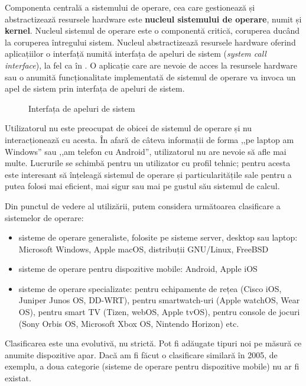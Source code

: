 Componenta centrală a sistemului de operare, cea care gestionează și abstractizează resursele hardware este \textbf{nucleul sistemului de operare}, numit și \textbf{kernel}. Nucleul sistemul de operare este o componentă critică, coruperea ducând la coruperea întregului sistem. Nucleul abstractizează resursele hardware oferind aplicațiilor o interfață numită interfața de apeluri de sistem (\textit{system call interface}), la fel ca în . O aplicație care are nevoie de acces la resursele hardware sau o anumită funcționalitate implementată de sistemul de operare va invoca un apel de sistem prin interfața de apeluri de sistem.

\begin{figure}[htbp]
  \centering
  \def\svgwidth{\columnwidth}
  
  \caption{Interfața de apeluri de sistem}
  \label{fig:intro:syscall-interface}
\end{figure}

Utilizatorul nu este preocupat de obicei de sistemul de operare și nu interacționează cu acesta. În afară de câteva informații de forma ,,pe laptop am Windows'' sau ,,am telefon cu Android'', utilizatorul nu are nevoie să afle mai multe. Lucrurile se schimbă pentru un utilizator cu profil tehnic; pentru acesta este interesant să înțeleagă sistemul de operare și particularitățile sale pentru a putea folosi mai eficient, mai sigur sau mai pe gustul său sistemul de calcul.

Din punctul de vedere al utilizării, putem considera următoarea clasificare a sistemelor de operare:

\begin{itemize}
  \item sisteme de operare generaliste, folosite pe sisteme server, desktop sau laptop: Microsoft Windows, Apple macOS, distribuții GNU/Linux, FreeBSD
  \item sisteme de operare pentru dispozitive mobile: Android, Apple iOS
  \item sisteme de operare specializate: pentru echipamente de rețea (Cisco iOS, Juniper Junos OS, DD-WRT), pentru smartwatch-uri (Apple watchOS, Wear OS), pentru smart TV (Tizen, webOS, Apple tvOS), pentru console de jocuri (Sony Orbis OS, Microsoft Xbox OS, Nintendo Horizon) etc.
\end{itemize}

Clasificarea este una evolutivă, nu strictă. Pot fi adăugate tipuri noi pe măsură ce anumite dispozitive apar. Dacă am fi făcut o clasificare similară în 2005, de exemplu, a doua categorie (sisteme de operare pentru dispozitive mobile) nu ar fi existat.

